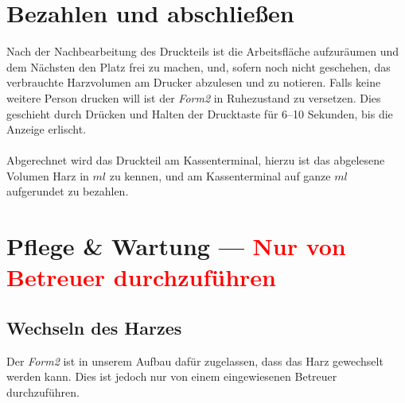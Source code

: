 \documentclass{\basedir/fablab-document}
\begin{document}

\section{Bezahlen und abschließen}

Nach der Nachbearbeitung des Druckteils ist die Arbeitsfläche aufzuräumen und dem Nächsten den Platz frei zu machen, und, sofern noch nicht geschehen, das verbrauchte Harzvolumen am Drucker abzulesen und zu notieren. Falls keine weitere Person drucken will ist der \textit{Form2} in Ruhezustand zu versetzen. Dies geschieht durch Drücken und Halten der Drucktaste für 6--10 Sekunden, bis die Anzeige erlischt. \\
\\
Abgerechnet wird das Druckteil am Kassenterminal, hierzu ist das abgelesene Volumen Harz in $ml$ zu kennen, und am Kassenterminal auf ganze $ml$ aufgerundet zu bezahlen.
\pagebreak


\section{Pflege \& Wartung --- \textcolor{red}{Nur von Betreuer durchzuführen}}

\subsection{Wechseln des Harzes}
Der \textit{Form2} ist in unserem Aufbau dafür zugelassen, dass das Harz gewechselt werden kann. Dies ist jedoch nur von einem eingewiesenen Betreuer durchzuführen. 
\end{document}
